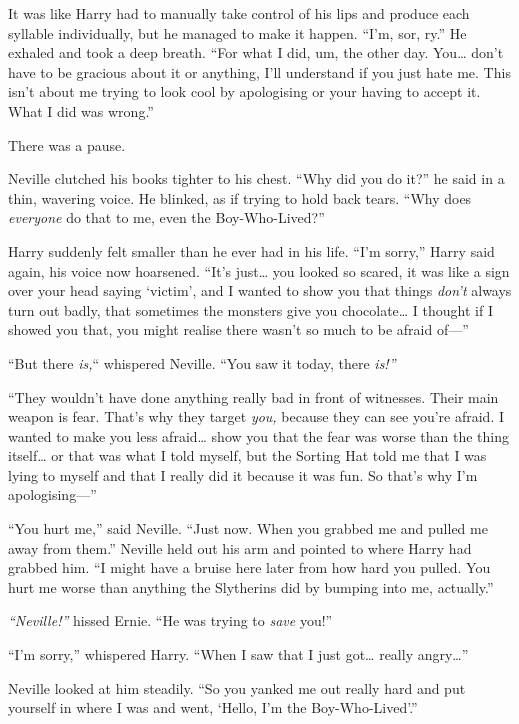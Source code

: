 It was like Harry had to manually take control of his lips and produce
each syllable individually, but he managed to make it happen. ``I'm,
sor, ry.'' He exhaled and took a deep breath. ``For what I did, um, the
other day. You\ldots{} don't have to be gracious about it or anything,
I'll understand if you just hate me. This isn't about me trying to look
cool by apologising or your having to accept it. What I did was wrong.''

There was a pause.

Neville clutched his books tighter to his chest. ``Why did you do it?''
he said in a thin, wavering voice. He blinked, as if trying to hold back
tears. ``Why does \emph{everyone} do that to me, even the
Boy-Who-Lived?''

Harry suddenly felt smaller than he ever had in his life. ``I'm sorry,''
Harry said again, his voice now hoarsened. ``It's just\ldots{} you
looked so scared, it was like a sign over your head saying `victim', and
I wanted to show you that things \emph{don't} always turn out badly,
that sometimes the monsters give you chocolate\ldots{} I thought if I
showed you that, you might realise there wasn't so much to be afraid
of---''

``But there \emph{is,}`` whispered Neville. ``You saw it today, there
\emph{is!''}

``They wouldn't have done anything really bad in front of witnesses.
Their main weapon is fear. That's why they target \emph{you,} because
they can see you're afraid. I wanted to make you less afraid\ldots{}
show you that the fear was worse than the thing itself\ldots{} or that
was what I told myself, but the Sorting Hat told me that I was lying to
myself and that I really did it because it was fun. So that's why I'm
apologising---''

``You hurt me,'' said Neville. ``Just now. When you grabbed me and
pulled me away from them.'' Neville held out his arm and pointed to
where Harry had grabbed him. ``I might have a bruise here later from how
hard you pulled. You hurt me worse than anything the Slytherins did by
bumping into me, actually.''

\emph{``Neville!''} hissed Ernie. ``He was trying to \emph{save} you!''

``I'm sorry,'' whispered Harry. ``When I saw that I just got\ldots{}
really angry\ldots{}''

Neville looked at him steadily. ``So you yanked me out really hard and
put yourself in where I was and went, `Hello, I'm the Boy-Who-Lived'.''

